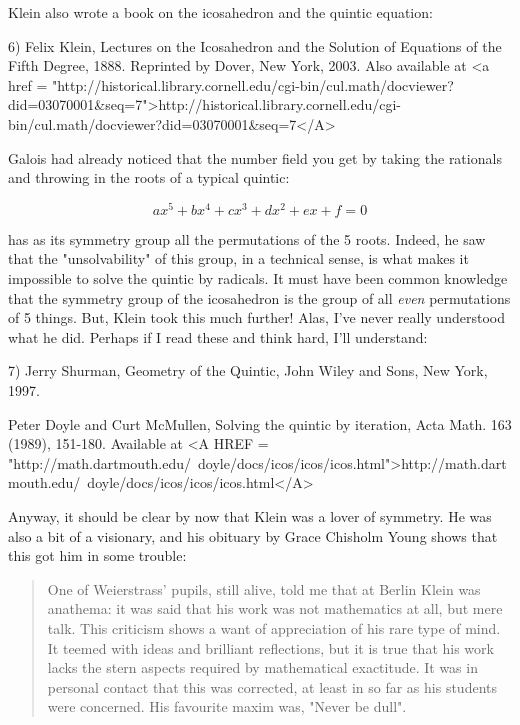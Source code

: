 Klein also wrote a book on the icosahedron and the quintic equation:

6) Felix Klein, Lectures on the Icosahedron and the Solution of Equations
of the Fifth Degree, 1888.  Reprinted by Dover, New York, 2003.
Also available at <a href = "http://historical.library.cornell.edu/cgi-bin/cul.math/docviewer?did=03070001&seq=7">http://historical.library.cornell.edu/cgi-bin/cul.math/docviewer?did=03070001&seq=7</A>

Galois had already noticed that the number field you get by taking the 
rationals and throwing in the roots of a typical quintic:


$$

ax^{5} + bx^{4} + cx^{3} + dx^{2} + ex + f = 0
$$
    
has as its symmetry group all the permutations of the 5 roots.  Indeed,
he saw that the "unsolvability" of this group, in a technical 
sense, is
what makes it impossible to solve the quintic by radicals.  It must have 
been common knowledge that the symmetry group of the icosahedron is the 
group of all \emph{even} permutations of 5 things.  But, Klein took this much
further!  Alas, I've never really understood what he did.  Perhaps if
I read these and think hard, I'll understand:

7) Jerry Shurman, Geometry of the Quintic, John Wiley and Sons, New York, 
1997.

Peter Doyle and Curt McMullen, Solving the quintic by iteration,
Acta Math. 163 (1989), 151-180.  Available at 
<A HREF = "http://math.dartmouth.edu/~doyle/docs/icos/icos/icos.html">http://math.dartmouth.edu/~doyle/docs/icos/icos/icos.html</A>

Anyway, it should be clear by now that Klein was a lover of symmetry.
He was also a bit of a visionary, and his obituary by Grace Chisholm 
Young shows that this got him in some trouble:

\begin{quote}
     One of Weierstrass' pupils, still alive, told me that at Berlin
     Klein was anathema: it was said that his work was not mathematics
     at all, but mere talk.  This criticism shows a want of appreciation
     of his rare type of mind.  It teemed with ideas and brilliant 
     reflections, but it is true that his work lacks the stern aspects 
     required by mathematical exactitude. It was in personal contact that 
     this was corrected, at least in so far as his students were concerned. 
     His favourite maxim was, "Never be dull". 
\end{quote}


